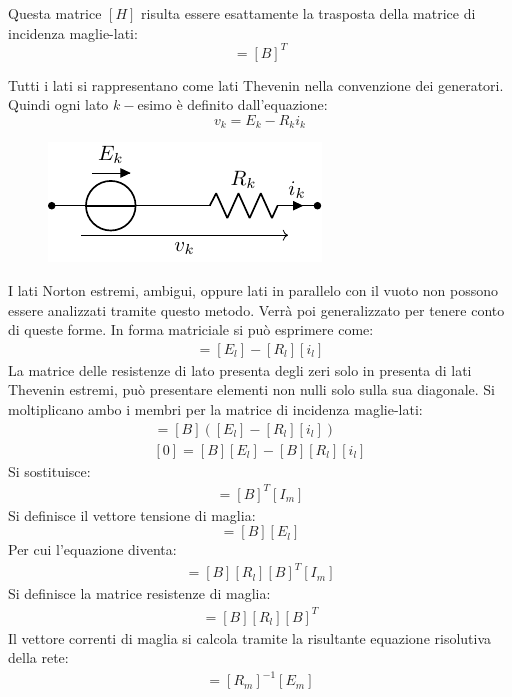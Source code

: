 \documentclass{article}
\numberwithin{equation}{subsection}
\begin{document}
Questa matrice $[H]$ risulta essere esattamente la trasposta della matrice di incidenza maglie-lati:
\begin{equation*}
    [H]=[B]^T
\end{equation*}

Tutti i lati si rappresentano come lati Thevenin nella convenzione dei generatori. Quindi ogni lato $k-$esimo è definito dall'equazione:
\begin{equation*}
    v_k=E_k-R_ki_k
\end{equation*}
\begin{figure}[H]%
    \centering
    \includegraphics{lato-thevenin-generico.pdf}%
    \label{fig:lato-thevenin-generico}
\end{figure}
I lati Norton estremi, ambigui, oppure lati in parallelo con il vuoto non possono essere analizzati tramite questo metodo. Verrà poi generalizzato per tenere conto di queste 
forme. In forma matriciale si può esprimere come:
\begin{gather*}
    [v_l]=[E_l]-[R_l][i_l]
\end{gather*}
La matrice delle resistenze di lato presenta degli zeri solo in presenta di lati Thevenin estremi, può presentare elementi non nulli solo sulla sua diagonale. 
Si moltiplicano ambo i membri per la matrice di incidenza maglie-lati:
\begin{gather*}
    [B][v_l]=[B]\left([E_l]-[R_l][i_l]\right)\\
    [0]=[B][E_l]-[B][R_l][i_l]
\end{gather*}
Si sostituisce:
\begin{gather*}
    [i_l]=[B]^T[I_m]
\end{gather*}
Si definisce il vettore tensione di maglia:
\begin{equation*}
    [E_m]=[B][E_l]
\end{equation*}
Per cui l'equazione diventa:
\begin{gather*}
    [E_m]=[B][R_l][B]^T[I_m]
\end{gather*}
Si definisce la matrice resistenze di maglia:
\begin{gather*}
    [R_m]=[B][R_l][B]^T
\end{gather*}
Il vettore correnti di maglia si calcola tramite la risultante equazione risolutiva della rete:
\begin{gather}
    [I_m]=[R_m]^{-1}[E_m]
\end{gather}
\end{document}
